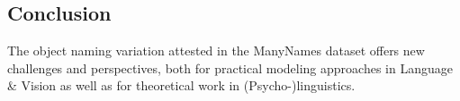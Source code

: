 \subsection{Conclusion}
\label{sec:conclusion}

The object naming variation attested in the ManyNames dataset offers new challenges and perspectives, both for practical modeling approaches in Language \& Vision as well as for theoretical work in (Psycho-)linguistics.


